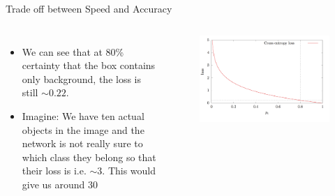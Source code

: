 \documentclass[aspectratio=169]{beamer}
\begin{document}
\begin{frame}{Trade off between Speed and Accuracy}
\begin{columns}[T, c, textwidth]
\begin{itemize}
    \item We can see that at 80\% certainty that the box contains only background, the loss is still $\sim0.22$.
    \item Imagine: We have ten actual objects in the image and the network is not really sure to which class they belong so that their loss is i.e. $\sim3$. This would give us around 30 
\end{itemize}
\begin{figure}
    \centering
    \includegraphics[scale=.2]{demo/figs/fcl2.png}
\end{figure}
\end{columns}
\end{frame}
\end{document}
